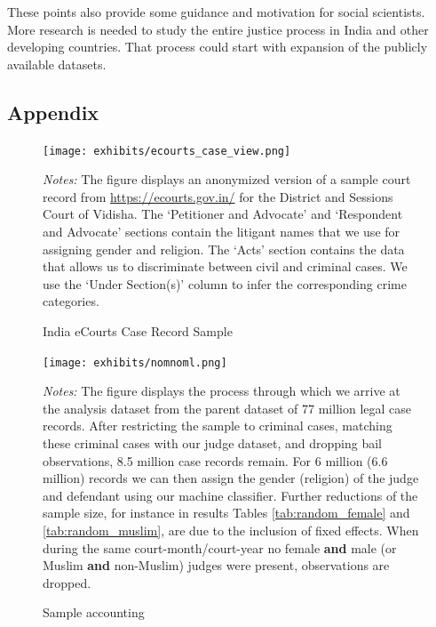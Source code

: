 \documentclass[12pt,english]{article}
\begin{document}
These points also provide some guidance and motivation for social scientists. More research is needed to study the entire justice process in India and other developing countries. That process could start with expansion of the publicly available datasets.

\clearpage





\clearpage

 
\begin{appendices}

\setcounter{figure}{0} 
\renewcommand{\thefigure}{A\arabic{figure}} 
\setcounter{table}{0} \renewcommand{\thetable}{A\arabic{table}} 


\section{Appendix}

\begin{figure}[htp!]
 \centering
 \caption{India eCourts Case Record Sample}
 \texttt{[image: exhibits/ecourts\_case\_view.png]}
 \label{fig:ecourts_case_view}
 \begin{minipage}{1.0\textwidth}
    {\scriptsize \emph{Notes:} The figure displays an anonymized version of a sample court record from \url{https://ecourts.gov.in/} for the District and Sessions Court of Vidisha. The `Petitioner and Advocate' and `Respondent and Advocate' sections contain the litigant names that we use for assigning gender and religion. The `Acts' section contains the data that allows us to discriminate between civil and criminal cases. We use the `Under Section(s)' column to infer the corresponding crime categories.\par}
 \end{minipage}
\end{figure}

\newpage

\begin{figure}[htp!]
 \centering
 \caption{Sample accounting}
 \texttt{[image: exhibits/nomnoml.png]}
 \label{fig:nomnoml}
 \begin{minipage}{1.0\textwidth}
    {\scriptsize \emph{Notes:} The figure displays the process through which we arrive at the analysis dataset from the parent dataset of 77 million legal case records. After restricting the sample to criminal cases, matching these criminal cases with our judge dataset, and dropping bail observations, 8.5 million case records remain. For 6 million (6.6 million) records we can then assign the gender (religion) of the judge and defendant using our machine classifier. Further reductions of the sample size, for instance in results Tables \ref{tab:random_female} and \ref{tab:random_muslim}, are due to the inclusion of fixed effects. When during the same court-month/court-year no female \textbf{and} male (or Muslim \textbf{and} non-Muslim) judges were present, observations are dropped.\par}
 \end{minipage}
\end{figure}


\end{appendices}
\end{document}
